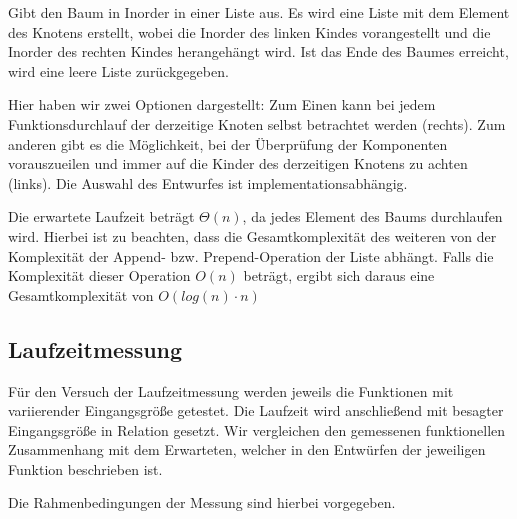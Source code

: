 \documentclass[11pt]{article}
\begin{document}
    Gibt den Baum in Inorder in einer Liste aus.
    Es wird eine Liste mit dem Element des Knotens erstellt,
    wobei die Inorder des linken Kindes vorangestellt und die
    Inorder des rechten Kindes herangehängt wird.
    Ist das Ende des Baumes erreicht, wird eine leere Liste zurückgegeben.

    Hier haben wir zwei Optionen dargestellt: Zum Einen kann bei jedem
    Funktionsdurchlauf der derzeitige Knoten selbst betrachtet werden (rechts).
    Zum anderen gibt es die Möglichkeit, bei der Überprüfung der Komponenten
    vorauszueilen und immer auf die Kinder des derzeitigen Knotens zu achten (links).
    Die Auswahl des Entwurfes ist implementationsabhängig.

    Die erwartete Laufzeit beträgt
    \begin{math}
        \Theta (n)
    \end{math},
    da jedes Element des Baums durchlaufen wird.
    Hierbei ist zu beachten, dass die Gesamtkomplexität des weiteren von der
    Komplexität der Append- bzw. Prepend-Operation der Liste abhängt.
    Falls die Komplexität dieser Operation
    \begin{math}
        O(n)
    \end{math}
    beträgt, ergibt sich daraus eine Gesamtkomplexität von
    \begin{math}
        O(log(n) \cdot n)
    \end{math}
    
    \subsection{Laufzeitmessung}\label{subsec:Laufzeitmessung}
    
        
        Für den Versuch der Laufzeitmessung werden jeweils die Funktionen mit variierender Eingangsgröße getestet. Die Laufzeit wird anschließend mit besagter Eingangsgröße in Relation gesetzt.
        Wir vergleichen den gemessenen funktionellen Zusammenhang mit dem Erwarteten, welcher in den Entwürfen der jeweiligen Funktion beschrieben ist.
        
        Die Rahmenbedingungen der Messung sind hierbei vorgegeben.
        
\end{document}
